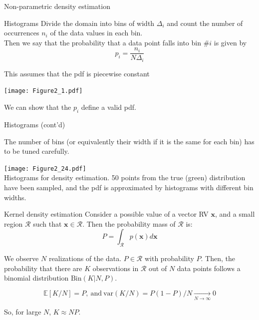 \documentclass{beamer}
\begin{document}
\begin{frame}{Non-parametric density estimation}

\begin{block}{Histograms}
Divide the domain into bins of width $\Delta_{i}$ and count the number of occurrences $n_{i}$ of the data values in each bin.\\
\vspace{0.2cm}
Then we say that the probability that a data point falls into bin $\#i$ is given by
\begin{equation*}
p_{i} = \frac{n_{i}}{N \Delta_{i}}
\end{equation*}

This assumes that the pdf is piecewise constant
\\
\begin{center}
\texttt{[image: Figure2\_1.pdf]}
\end{center}
\vspace{-0.6cm}
We can show that the $p_i$ define a valid pdf.
\end{block}

\end{frame}

\begin{frame}{Histograms (cont'd)}

The number of bins (or equivalently their width if it is the same for each bin) has to be tuned carefully.

\begin{center}
\texttt{[image: Figure2\_24.pdf]}\\
\tiny{Histograms for density estimation. 50 points from the true (green) distribution have been sampled, and the pdf is approximated by histograms with different bin widths.}
\end{center}
\end{frame}

\begin{frame}{Kernel density estimation}
Consider a possible value of a vector RV $\mathbf{x}$, and a small region $\mathcal{R}$ such that $\mathbf{x}\in{\mathcal{R}}$. Then the probability mass of $\mathcal{R}$ is:
\begin{equation*}
P = \int_{\mathcal{R}} p(\mathbf{x})d\mathbf{x}
\end{equation*}

We observe $N$ realizations of the data. $P\in\mathcal{R}$ with probability $P$. Then, the probability that there are $K$ observations in $\mathcal{R}$ out of $N$ data points follows a binomial distribution $\textrm{Bin}(K|N,P)$.

\begin{equation*}
\mathbb{E}[K/N] = P, \ \textrm{and} \ \textrm{var}(K/N) = P(1-P)/N \underset{N\rightarrow \infty}{\rightarrow} 0
\end{equation*}

So, for large $N$, $K\approx NP$.\\
\end{frame}
\end{document}
